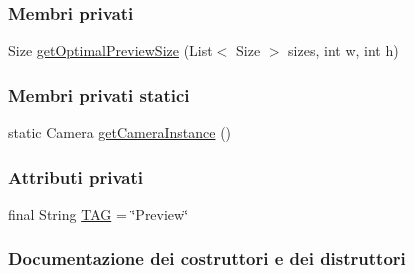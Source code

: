 \subsubsection*{Membri privati}
\begin{DoxyCompactItemize}
\item 
Size \hyperlink{classit_1_1unibo_1_1torsello_1_1bluetoothpositioning_1_1examplesCamera_1_1Preview_a46718c866d8f8bc77c5efb98f38e8ad8_a46718c866d8f8bc77c5efb98f38e8ad8}{get\+Optimal\+Preview\+Size} (List$<$ Size $>$ sizes, int w, int h)
\end{DoxyCompactItemize}
\subsubsection*{Membri privati statici}
\begin{DoxyCompactItemize}
\item 
static Camera \hyperlink{classit_1_1unibo_1_1torsello_1_1bluetoothpositioning_1_1examplesCamera_1_1Preview_a89ed563293f04de8313a866702452738_a89ed563293f04de8313a866702452738}{get\+Camera\+Instance} ()
\end{DoxyCompactItemize}
\subsubsection*{Attributi privati}
\begin{DoxyCompactItemize}
\item 
final String \hyperlink{classit_1_1unibo_1_1torsello_1_1bluetoothpositioning_1_1examplesCamera_1_1Preview_a0e05d509a5425eba210e8d1a816c1d42_a0e05d509a5425eba210e8d1a816c1d42}{T\+AG} = \char`\"{}Preview\char`\"{}
\end{DoxyCompactItemize}


\subsubsection{Documentazione dei costruttori e dei distruttori}
\hypertarget{classit_1_1unibo_1_1torsello_1_1bluetoothpositioning_1_1examplesCamera_1_1Preview_ae54d5d8e5125fd0a38b28d9416cc0191_ae54d5d8e5125fd0a38b28d9416cc0191}{}\label{classit_1_1unibo_1_1torsello_1_1bluetoothpositioning_1_1examplesCamera_1_1Preview_ae54d5d8e5125fd0a38b28d9416cc0191_ae54d5d8e5125fd0a38b28d9416cc0191} 
